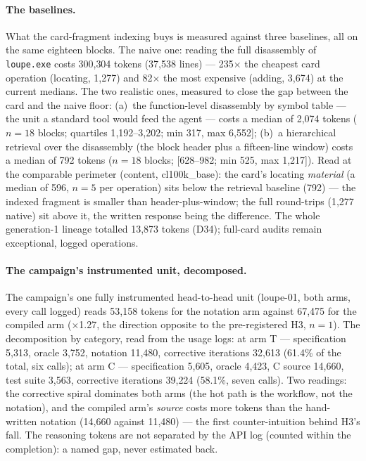 \documentclass[10pt,a4paper]{article}
\newcommand{\code}[1]{\texttt{\small #1}}
\begin{document}
\paragraph{The baselines.}
What the card-fragment indexing buys is measured against three
baselines, all on the same eighteen blocks. The naive one: reading the
full disassembly of \code{loupe.exe} costs 300{,}304 tokens
(37{,}538 lines) --- 235$\times$ the cheapest card operation (locating,
1{,}277) and 82$\times$ the most expensive (adding, 3{,}674) at the
current medians. The two realistic ones, measured to close the gap
between the card and the naive floor: (a)~the function-level
disassembly by symbol table --- the unit a standard tool would feed the
agent --- costs a median of 2{,}074 tokens ($n{=}18$ blocks; quartiles
1{,}192--3{,}202;
min 317, max 6{,}552]; (b)~a hierarchical retrieval over the disassembly
(the block header plus a fifteen-line window) costs a median of 792
tokens ($n{=}18$ blocks; [628--982; min 525, max 1{,}217]). Read at the comparable perimeter
(content, cl100k\_base): the card's locating \emph{material} (a median
of 596, $n{=}5$ per operation) sits below the retrieval baseline (792) --- the indexed fragment
is smaller than header-plus-window; the full round-trips (1{,}277 native)
sit above it, the written response being the difference. The whole
generation-1 lineage totalled 13{,}873 tokens (D34); full-card audits
remain exceptional, logged operations.

\paragraph{The campaign's instrumented unit, decomposed.}
The campaign's one fully instrumented head-to-head unit (loupe-01, both
arms, every call logged) reads 53{,}158 tokens for the notation arm
against 67{,}475 for the compiled arm ($\times$1.27, the direction
opposite to the pre-registered H3, $n{=}1$). The decomposition by
category, read from the usage logs: at arm T --- specification 5{,}313,
oracle 3{,}752, notation 11{,}480, corrective iterations 32{,}613
(61.4\% of the total, six calls); at arm C --- specification 5{,}605,
oracle 4{,}423, C source 14{,}660, test suite 3{,}563, corrective
iterations 39{,}224 (58.1\%, seven calls). Two readings: the corrective
spiral dominates both arms (the hot path is the workflow, not the
notation), and the compiled arm's \emph{source} costs more tokens than
the hand-written notation (14{,}660 against 11{,}480) --- the first
counter-intuition behind H3's fall. The reasoning tokens are not
separated by the API log (counted within the completion): a named gap,
never estimated back.
\end{document}
